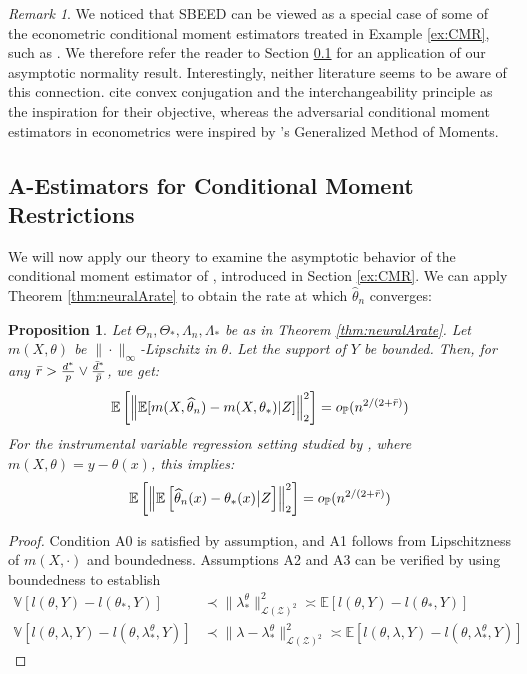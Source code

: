 \documentclass[12pt]{article}
\theoremstyle{myplain}
\newtheorem{proposition}{Proposition}[section]
\theoremstyle{definition}
\theoremstyle{definition}
\theoremstyle{remark}
\newtheorem{remark}{Remark}[section]
\numberwithin{equation}{section}
\begin{document}
\begin{remark}
We noticed that SBEED can be viewed as a special case of some of the econometric conditional moment estimators  treated in Example \ref{ex:CMR}, such as \cite{dikkala2020minimax}. We therefore refer the reader to Section \ref{app:CMR} for an application of our asymptotic normality result. Interestingly, neither literature seems to be aware of this connection. \cite{sbeed} cite convex conjugation and the interchangeability principle as the inspiration for their objective, whereas the adversarial conditional moment estimators in econometrics were inspired by \cite{hansen1982gmm}'s Generalized Method of Moments.
\end{remark}

\subsection{A-Estimators for Conditional Moment Restrictions} \label{app:CMR}
We will now apply our theory to examine the asymptotic behavior of the conditional moment estimator of \cite{dikkala2020minimax}, introduced in Section \ref{ex:CMR}. We can apply Theorem \ref{thm:neuralArate} to obtain the rate at which $\widehat{\theta}_n$ converges:
\begin{proposition}\label{thm:cmrrate}
Let $\Theta_n,\Theta_*, \Lambda_n, \Lambda_*$ be as in Theorem \ref{thm:neuralArate}. Let $m(X,\theta)$ be $\|\cdot\|_\infty$-Lipschitz in $\theta$. Let the support of $Y$ be bounded. Then, for any $\Bar{r}>\frac{d^*}{p}\vee\frac{\Bar{d}^*}{\Bar{p}}$, we get:
$$\mathbb{E}\left[\left\|\mathbb{E}[m(X,\widehat{\theta}_n)-m(X,\theta_*)|Z]\right\|^2_2\right]=o_\mathbb{P}(n^{2/(2+\Bar{r})})$$
For the instrumental variable regression setting studied by \cite{dikkala2020minimax}, where $m(X,\theta)=y-\theta(x)$, this implies:
$$\mathbb{E}\left[\left\|\mathbb{E}\left[\widehat{\theta}_n(x)-\theta_*(x)\big\vert Z\right]\right\|^2_2\right]=o_\mathbb{P}(n^{2/(2+\Bar{r})})$$
\end{proposition}
\begin{proof}
Condition A0 is satisfied by assumption, and A1 follows from Lipschitzness of $m(X,\cdot)$ and boundedness. Assumptions A2 and A3 can be verified by using boundedness to establish
\begin{align*}
 \mathbb{V}[l(\theta, Y)-l(\theta_*, Y)] & \prec \|\lambda_*^\theta\|_{\mathcal{L}(\mathcal{Z})^2}^2 \asymp\mathbb{E}[l(\theta,Y)-l(\theta_*, Y)] \\
 \mathbb{V}[l(\theta,\lambda,Y)-l(\theta, \lambda_*^\theta, Y)] & \prec\|\lambda-\lambda_*^\theta\|_{\mathcal{L}(\mathcal{Z})^2}^2\asymp\mathbb{E}[l(\theta,\lambda,Y)-l(\theta, \lambda_*^\theta, Y)]
\end{align*}
\end{proof}
\end{document}
